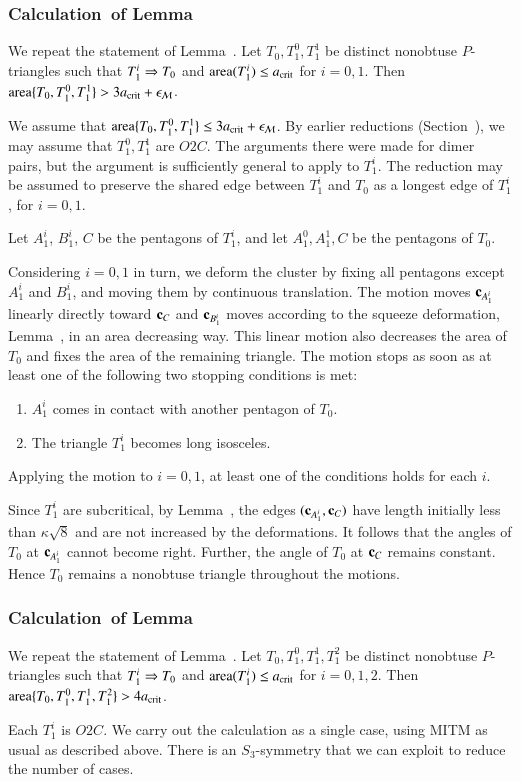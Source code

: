 \subsubsection{Calculation~of Lemma~} %

We repeat the statement of Lemma~. Let
$T_0,T_1^0,T_1^1$ be distinct nonobtuse $P$-triangles such that
$T_1^i\Rightarrow T_0$ and ${\operatorname{area}}(T_1^i)\le a_\text{crit}$ for $i=0,1$. Then ${\operatorname{area}}\{T_0,T_1^0,T_1^1\} > 3a_\text{crit} +
\epsilon_{\mathcal M}$. %

We assume that ${\operatorname{area}}\{T_0,T_1^0,T_1^1\}\le 3a_\text{crit} + \epsilon_{\mathcal M}$.
By earlier reductions (Section~), we may assume
that $T_1^0,T_1^1$ are $O2C$.  The arguments there were made for dimer pairs, but the argument
is sufficiently general to apply to $T_1^i$.
The reduction may be assumed to preserve the shared edge between $T_1^i$ and $T_0$
as a longest edge of $T_1^i$, for $i=0,1$.

Let $A_1^i$, $B_1^i$, $C$ be the pentagons of $T_1^i$,
and let $A_1^0,A_1^1,C$ be the pentagons of $T_0$.

Considering $i=0,1$ in turn, we deform the cluster by fixing all pentagons
except $A_1^i$ and $B_1^i$, and moving them by continuous translation.
The motion moves ${\mathbf c}_{A_1^i}$ linearly directly toward ${\mathbf c}_C$ and ${\mathbf c}_{B_1^i}$
moves according to the squeeze deformation, Lemma~,
in an area decreasing way.  This linear motion also decreases the area
of $T_0$ and fixes the area of the remaining triangle.
The motion stops as soon as at least one of the
following two stopping conditions is met:
\begin{enumerate}
\item $A_1^i$ comes in contact with another pentagon of $T_0$.
\item The triangle $T_1^i$ becomes long isosceles.
\end{enumerate}
Applying the motion to $i=0,1$, at least one of the conditions holds for each $i$.

Since $T_1^i$ are subcritical, by Lemma~, the edges
$({\mathbf c}_{A_1^i},{\mathbf c}_C)$ have length initially less than $\kappa\sqrt8$ and
are not increased by the deformations.  It follows that the angles of $T_0$
at ${\mathbf c}_{A_1^i}$ cannot become right.  Further, the angle of $T_0$ at ${\mathbf c}_C$
remains constant.  Hence $T_0$ remains a nonobtuse triangle throughout
the motions.

\subsubsection{Calculation~of Lemma~} 

We repeat the statement of Lemma~. Let
$T_0,T_1^0,T_1^1,T_1^2$ be distinct nonobtuse $P$-triangles such that
$T_1^i\Rightarrow T_0$ and ${\operatorname{area}}(T_1^i)\le a_\text{crit}$ for $i=0,1,2$. Then ${\operatorname{area}}\{T_0,T_1^0,T_1^1,T_1^2\} >
4a_\text{crit}$. %

Each $T_1^i$ is $O2C$.  We carry out the calculation as a single case,
using MITM as usual as described above.  There is an $S_3$-symmetry %
that we can exploit to reduce the number of cases. 

